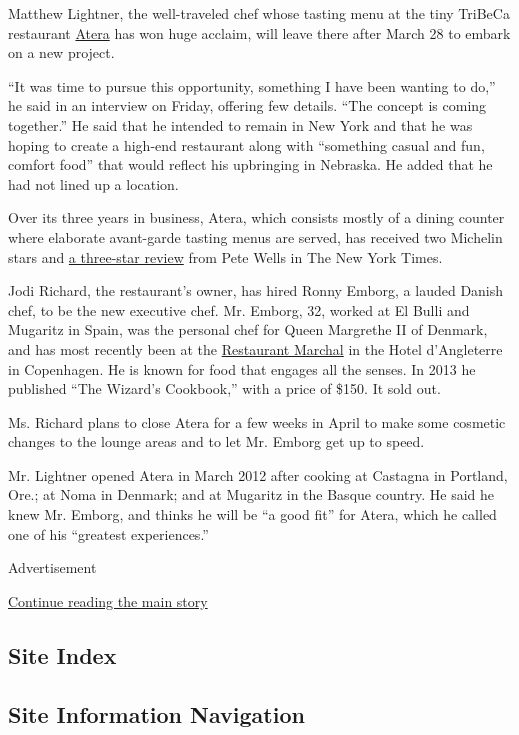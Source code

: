 Matthew Lightner, the well-traveled chef whose tasting menu at the tiny
TriBeCa restaurant \href{http://www.ateranyc.com/}{Atera} has won huge
acclaim, will leave there after March 28 to embark on a new project.

``It was time to pursue this opportunity, something I have been wanting
to do,'' he said in an interview on Friday, offering few details. ``The
concept is coming together.'' He said that he intended to remain in New
York and that he was hoping to create a high-end restaurant along with
``something casual and fun, comfort food'' that would reflect his
upbringing in Nebraska. He added that he had not lined up a location.

Over its three years in business, Atera, which consists mostly of a
dining counter where elaborate avant-garde tasting menus are served, has
received two Michelin stars and
\href{http://www.nytimes3xbfgragh.onion/2012/07/18/dining/reviews/atera-in-tribeca.html}{a
three-star review} from Pete Wells in The New York Times.

Jodi Richard, the restaurant's owner, has hired Ronny Emborg, a lauded
Danish chef, to be the new executive chef. Mr. Emborg, 32, worked at El
Bulli and Mugaritz in Spain, was the personal chef for Queen Margrethe
II of Denmark, and has most recently been at the
\href{http://marchal.dk/en/}{Restaurant Marchal} in the Hotel
d'Angleterre in Copenhagen. He is known for food that engages all the
senses. In 2013 he published ``The Wizard's Cookbook,'' with a price of
\$150. It sold out.

Ms. Richard plans to close Atera for a few weeks in April to make some
cosmetic changes to the lounge areas and to let Mr. Emborg get up to
speed.

Mr. Lightner opened Atera in March 2012 after cooking at Castagna in
Portland, Ore.; at Noma in Denmark; and at Mugaritz in the Basque
country. He said he knew Mr. Emborg, and thinks he will be ``a good
fit'' for Atera, which he called one of his ``greatest experiences.''

Advertisement

\protect\hyperlink{after-bottom}{Continue reading the main story}

\hypertarget{site-index}{%
\subsection{Site Index}\label{site-index}}

\hypertarget{site-information-navigation}{%
\subsection{Site Information
Navigation}\label{site-information-navigation}}

